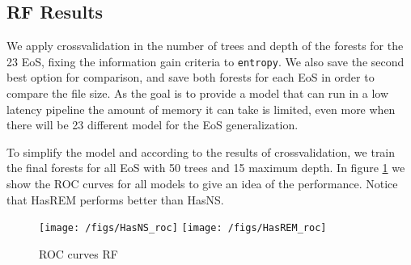 \subsection{RF Results}

We apply crossvalidation in the number of trees and depth of the forests for the 23 EoS, fixing the information gain criteria to \texttt{entropy}. We also save the second best option for comparison, and save both forests for each EoS in order to compare the file size. As the goal is to provide a model that can run in a low latency pipeline the amount of memory it can take is limited, even more when there will be 23 different model for the EoS generalization.



To simplify the model and according to the results of crossvalidation, we train the final forests for all EoS with 50 trees and 15 maximum depth. In figure \ref{fig:RF_roc} we show the ROC curves for all models to give an idea of the performance. Notice that HasREM performs better than HasNS. 
\begin{figure}
\centering
\texttt{[image: /figs/HasNS\_roc]}
\texttt{[image: /figs/HasREM\_roc]}
\caption{\label{fig:RF_roc} ROC curves RF}
\end{figure}




